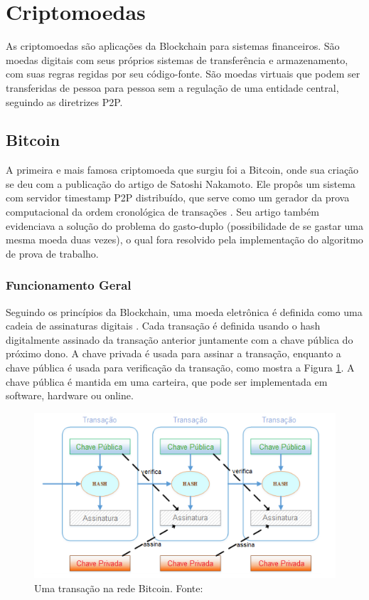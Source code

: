 \documentclass[openright]{normas-utf-tex} %
\begin{document}
\section{Criptomoedas}

As criptomoedas são aplicações da Blockchain para sistemas financeiros. São moedas digitais com seus próprios sistemas de transferência e armazenamento, com suas regras regidas por seu código-fonte. São moedas virtuais que podem ser transferidas de pessoa para pessoa sem a regulação de uma entidade central, seguindo as diretrizes P2P.

\subsection{Bitcoin}

A primeira e mais famosa criptomoeda que surgiu foi a Bitcoin, onde sua criação se deu com a publicação do artigo de Satoshi Nakamoto. Ele propôs um sistema com servidor timestamp P2P distribuído, que serve como um gerador da prova computacional da ordem cronológica de transações \cite{Nakamoto2008}. Seu artigo também evidenciava a solução do problema do gasto-duplo (possibilidade de se gastar uma mesma moeda duas vezes), o qual fora resolvido pela implementação do algoritmo de prova de trabalho.

\subsubsection{Funcionamento Geral}

Seguindo os princípios da Blockchain, uma moeda eletrônica é definida como uma cadeia de assinaturas digitais \cite{Vujicic2018}. Cada transação é definida usando o hash digitalmente assinado da transação anterior juntamente com a chave pública do próximo dono. A chave privada é usada para assinar a transação, enquanto a chave pública é usada para verificação da transação, como mostra a Figura \ref{fig:transaction}. A chave pública é mantida em uma carteira, que pode ser implementada em software, hardware ou online. 

\begin{figure}[ht]
\centering
\includegraphics[width=1.0\textwidth]{transaction.PNG}
\caption{Uma transação na rede Bitcoin. Fonte: }
\label{fig:transaction}
\end{figure}
\end{document}
